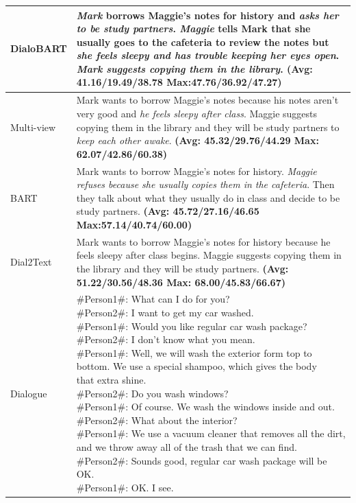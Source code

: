 \documentclass[letterpaper]{article} %
\begin{document}
\begin{table}
\begin{tabular}{p{1.5cm}p{14.5cm}}
				\hline
		DialoBART & \textit{Mark} borrows Maggie's notes for history and \textit{asks her to be study partners}. \textit{Maggie} tells Mark that she usually goes to the cafeteria to review the notes but \textit{she feels sleepy and has trouble keeping her eyes open}. \textit{Mark suggests copying them in the library}. \textbf{(Avg: 41.16/19.49/38.78 Max:47.76/36.92/47.27)}\\
				\hline
		Multi-view & Mark wants to borrow Maggie's notes because his notes aren't very good and \textit{he feels sleepy after class}. Maggie suggests copying them in the library and they will be study partners to \textit{keep each other awake}. \textbf{(Avg: 45.32/29.76/44.29 Max: 62.07/42.86/60.38)}\\
				\hline
		BART & Mark wants to borrow Maggie's notes for history. \textit{Maggie refuses because she usually copies them in the cafeteria}. Then they talk about what they usually do in class and decide to be study partners. \textbf{(Avg: 45.72/27.16/46.65 Max:57.14/40.74/60.00)}\\
				\hline
		Dial2Text & Mark wants to borrow Maggie's notes for history because he feels sleepy after class begins. Maggie suggests copying them in the library and they will be study partners. \textbf{(Avg: 51.22/30.56/48.36 Max: 68.00/45.83/66.67)}\\
		\midrule[1pt]
		Dialogue & \makecell[l]{\#Person1\#: What can I do for you?\\
		\#Person2\#: I want to get my car washed.\\
		\#Person1\#: Would you like regular car wash package?\\
		\#Person2\#: I don't know what you mean.\\
		\#Person1\#: Well, we will wash the exterior form top to bottom. We use a special shampoo, which gives the body \\ \quad\quad\quad\quad\quad that extra shine.\\
		\#Person2\#: Do you wash windows?\\
		\#Person1\#: Of course. We wash the windows inside and out.\\
		\#Person2\#: What about the interior?\\
		\#Person1\#: We use a vacuum cleaner that removes all the dirt, and we throw away all of the trash that we can find.\\
		\#Person2\#: Sounds good, regular car wash package will be OK.\\
		\#Person1\#: OK. I see.} \\

\end{tabular}
\end{table}
\end{document}
